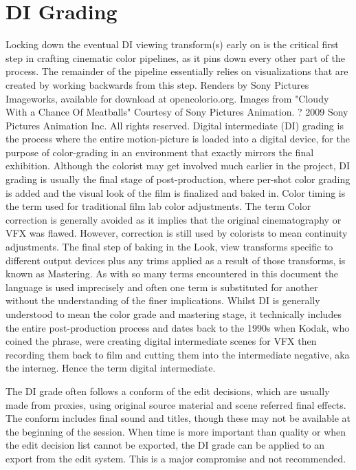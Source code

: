 \section{DI Grading}%
\label{sec:di-grading}

Locking down the eventual DI viewing transform(s) early on is the critical first step in crafting cinematic color pipelines, as it pins down every other part of the process. The remainder of the pipeline essentially relies on visualizations that are created by working backwards from this step.
Renders by Sony Pictures Imageworks, available for download at opencolorio.org. Images from "Cloudy With a Chance Of Meatballs" Courtesy of Sony Pictures Animation. ? 2009 Sony Pictures Animation Inc. All rights reserved.
Digital intermediate (DI) grading is the process where the entire motion-picture is loaded into a digital device, for the purpose of color-grading in an environment that exactly mirrors the final exhibition.  Although the colorist may get involved much earlier in the project, DI grading is usually the final stage of post-production, where per-shot color grading is added and the visual look of the film is finalized and baked in. Color timing is the term used for traditional film lab color adjustments. The term Color correction is generally avoided as it implies that the original cinematography or VFX was flawed. However, correction is still used by colorists to mean continuity adjustments. The final step of baking in the Look, view transforms specific to different output devices plus any trims applied as a result of those transforms, is known as Mastering. As with so many terms encountered in this document the language is used imprecisely and often one term is substituted for another without the understanding of the finer implications. Whilst DI is generally understood to mean the color grade and mastering stage, it technically includes the entire post-production process and dates back to the 1990s when Kodak, who coined the phrase, were creating digital intermediate scenes for VFX then recording them back to film and cutting them into the intermediate negative, aka the interneg. Hence the term digital intermediate.

The DI grade often follows a conform of the edit decisions, which are usually made from proxies, using original source material and scene referred final effects. The conform includes final sound and titles, though these may not be available at the beginning of the session. When time is more important than quality or when the edit decision list cannot be exported, the DI grade can be applied to an export from the edit system. This is a major compromise and not recommended.

